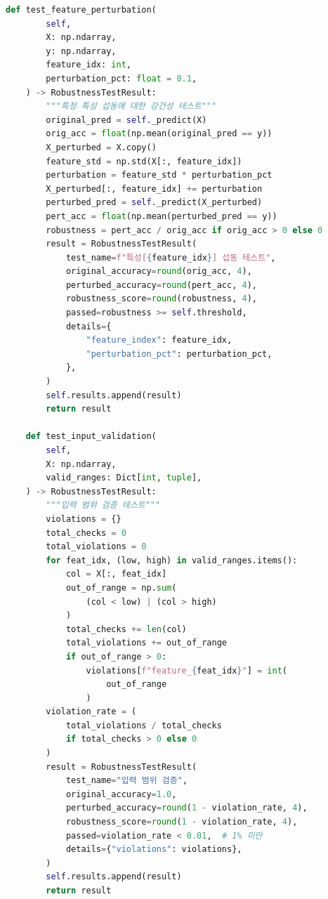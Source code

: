\begin{lstlisting}[language=Python, caption={적대적 강건성 테스트 프레임워크}, label={lst:adversarial_test}]
    def test_feature_perturbation(
        self,
        X: np.ndarray,
        y: np.ndarray,
        feature_idx: int,
        perturbation_pct: float = 0.1,
    ) -> RobustnessTestResult:
        """특정 특성 섭동에 대한 강건성 테스트"""
        original_pred = self._predict(X)
        orig_acc = float(np.mean(original_pred == y))
        X_perturbed = X.copy()
        feature_std = np.std(X[:, feature_idx])
        perturbation = feature_std * perturbation_pct
        X_perturbed[:, feature_idx] += perturbation
        perturbed_pred = self._predict(X_perturbed)
        pert_acc = float(np.mean(perturbed_pred == y))
        robustness = pert_acc / orig_acc if orig_acc > 0 else 0
        result = RobustnessTestResult(
            test_name=f"특성[{feature_idx}] 섭동 테스트",
            original_accuracy=round(orig_acc, 4),
            perturbed_accuracy=round(pert_acc, 4),
            robustness_score=round(robustness, 4),
            passed=robustness >= self.threshold,
            details={
                "feature_index": feature_idx,
                "perturbation_pct": perturbation_pct,
            },
        )
        self.results.append(result)
        return result

    def test_input_validation(
        self,
        X: np.ndarray,
        valid_ranges: Dict[int, tuple],
    ) -> RobustnessTestResult:
        """입력 범위 검증 테스트"""
        violations = {}
        total_checks = 0
        total_violations = 0
        for feat_idx, (low, high) in valid_ranges.items():
            col = X[:, feat_idx]
            out_of_range = np.sum(
                (col < low) | (col > high)
            )
            total_checks += len(col)
            total_violations += out_of_range
            if out_of_range > 0:
                violations[f"feature_{feat_idx}"] = int(
                    out_of_range
                )
        violation_rate = (
            total_violations / total_checks
            if total_checks > 0 else 0
        )
        result = RobustnessTestResult(
            test_name="입력 범위 검증",
            original_accuracy=1.0,
            perturbed_accuracy=round(1 - violation_rate, 4),
            robustness_score=round(1 - violation_rate, 4),
            passed=violation_rate < 0.01,  # 1% 미만
            details={"violations": violations},
        )
        self.results.append(result)
        return result


\end{lstlisting}
